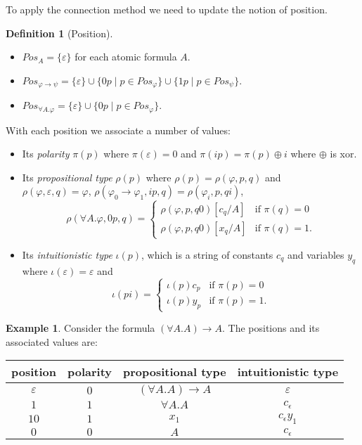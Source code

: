 \documentclass[11pt]{article}
\theoremstyle{definition}
\theoremstyle{definition}
\theoremstyle{definition}
\theoremstyle{definition}
\theoremstyle{definition}
\newtheorem{definition}[theorem]{Definition}
\theoremstyle{definition}
\newtheorem{example}[theorem]{Example}
\theoremstyle{definition}
\newcommand{\pos}{\mathit{Pos}}
\begin{document}
	To apply the connection method we need to update the notion of position.
	\begin{definition}[Position]\label{def:f-position}
		\hphantom{x}
		\begin{itemize}
			\item $\pos_A = \{\varepsilon\}$ for each atomic formula $A$.
			\item $\pos_{\varphi\to\psi} = \{\varepsilon\}\cup\{0p\mid p\in\pos_\varphi\}\cup\{1p\mid p\in\pos_\psi\}$.
			\item $\pos_{\forall A. \varphi} = \{\varepsilon\}\cup\{0p\mid p\in\pos_\varphi\}$.
		\end{itemize}
		With each position we associate a number of values:
		\begin{itemize}
			\item Its \emph{polarity} $\pi(p)$ where $\pi(\varepsilon) = 0$ and $\pi(ip) = \pi(p) \oplus i$ where $\oplus$ is xor.
			\item Its \emph{propositional type} $\rho(p)$ where $\rho(p) = \rho(\varphi, p, q)$ and\\$\rho(\varphi, \varepsilon, q) = \varphi$, $\rho(\varphi_0\to\varphi_1, ip, q) = \rho(\varphi_i, p, qi)$, \[\rho(\forall A.\varphi, 0p, q) = \begin{cases}
				\rho(\varphi, p, q0)[c_q/A] & \text{if } \pi(q) = 0\\
				\rho(\varphi, p, q0)[x_q/A] & \text{if } \pi(q) = 1.
			\end{cases}\]
			\item Its \emph{intuitionistic type} $\iota(p)$, which is a string of constants $c_q$ and variables $y_q$ where $\iota(\varepsilon) = \varepsilon$ and
			\[\iota(pi) = \begin{cases}
				\iota(p)c_p & \text{if } \pi(p) = 0\\
				\iota(p)y_p & \text{if } \pi(p) = 1.
			\end{cases}\]
		\end{itemize}
	\end{definition}

	\begin{example}
		Consider the formula $(\forall A. A)\to A$. The positions and its associated values are:
		\begin{center}
			\begin{tabular}[]{c|c|c|c}
				position & polarity & propositional type & intuitionistic type\\\hline
				$\varepsilon$ & $0$ & $(\forall A. A)\to A$ & $\varepsilon$\\
				$1$ & $1$ & $\forall A.A$ & $c_\epsilon$\\
				$10$ & $1$ & $x_1$ & $c_\epsilon y_1$\\
				$0$ & $0$ & $A$ & $c_\epsilon$
			\end{tabular}
		\end{center}
	\end{example}
\end{document}
